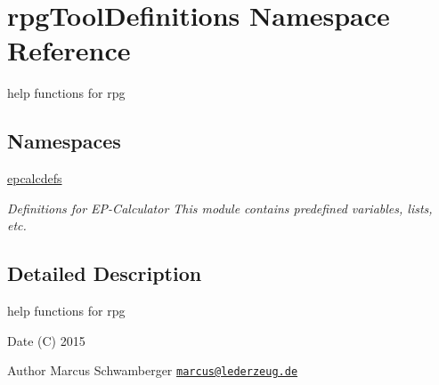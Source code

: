 \hypertarget{namespacerpgToolDefinitions}{}\section{rpg\+Tool\+Definitions Namespace Reference}
\label{namespacerpgToolDefinitions}


help functions for rpg  


\subsection*{Namespaces}
\begin{DoxyCompactItemize}
\item 
 \hyperlink{namespacerpgToolDefinitions_1_1epcalcdefs}{epcalcdefs}
\begin{DoxyCompactList}\small\item\em Definitions for E\+P-\/\+Calculator This module contains predefined variables, lists, etc. \end{DoxyCompactList}\end{DoxyCompactItemize}


\subsection{Detailed Description}
help functions for rpg 

\begin{DoxyDate}{Date}
(C) 2015 
\end{DoxyDate}
\begin{DoxyAuthor}{Author}
Marcus Schwamberger  \href{mailto:marcus@lederzeug.de}{\tt marcus@lederzeug.\+de} 
\end{DoxyAuthor}
